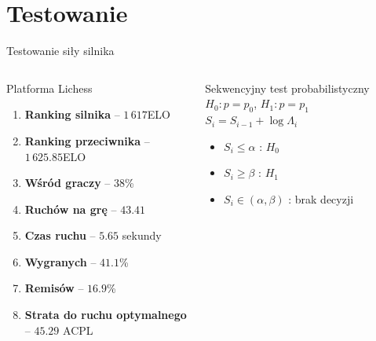 \section{Testowanie}\label{sec:testowanie-sily-silnika}

\begin{frame}{Testowanie siły silnika}
    \begin{columns}
        \begin{column}{0.5\textwidth}
            \begin{block}{Platforma Lichess}
                \begin{enumerate}
                    \item \textbf{Ranking silnika} – $1\,617$ELO
                    \item \textbf{Ranking przeciwnika} – $1\,625.85$ELO
                    \item \textbf{Wśród graczy} – $38$\%
                    \item \textbf{Ruchów na grę} – $43.41$
                    \item \textbf{Czas ruchu} – $5.65$ sekundy
                    \item \textbf{Wygranych} – $41.1$\%
                    \item \textbf{Remisów} – $16.9$\%
                    \item \textbf{Strata do ruchu optymalnego} – $45.29$ ACPL
                \end{enumerate}
            \end{block}
        \end{column}
        \begin{column}{0.5\textwidth}
            \begin{block}{Sekwencyjny test probabilistyczny}
                $H_{0}:p=p_{0}$, $H_{1}:p=p_{1}$ \\

                $S_{i}=S_{i-1}+\log \Lambda _{i}$
                \begin{itemize}
                    \item $S_{i} \le \alpha$ : $H_{0}$
                    \item $S_{i} \ge \beta$ : $H_{1}$
                    \item $S_{i} \in (\alpha, \beta)$ : brak decyzji
                \end{itemize}


\end{block}
\end{column}
\end{columns}
\end{frame}
